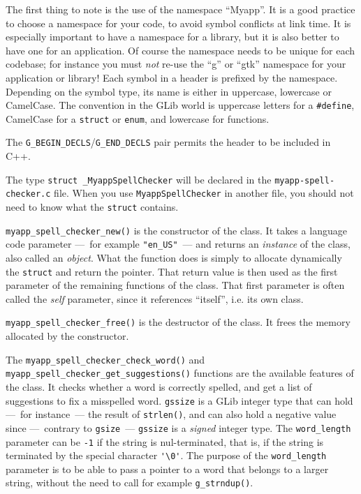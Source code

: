 The first thing to note is the use of the namespace ``Myapp''. It is a good practice to choose a namespace for your code, to avoid symbol conflicts at link time. It is especially important to have a namespace for a library, but it is also better to have one for an application. Of course the namespace needs to be unique for each codebase; for instance you must \emph{not} re-use the ``g'' or ``gtk'' namespace for your application or library! Each symbol in a header is prefixed by the namespace. Depending on the symbol type, its name is either in uppercase, lowercase or CamelCase. The convention in the GLib world is uppercase letters for a \lstinline{#define}, CamelCase for a \lstinline{struct} or \lstinline{enum}, and lowercase for functions.

The \lstinline{G_BEGIN_DECLS}/\lstinline{G_END_DECLS} pair permits the header to be included in C++.

The type \lstinline{struct _MyappSpellChecker} will be declared in the \texttt{myapp-spell-checker.c} file. When you use \lstinline{MyappSpellChecker} in another file, you should not need to know what the \lstinline{struct} contains.

\lstinline{myapp_spell_checker_new()} is the constructor of the class. It takes a language code parameter ---~for example \lstinline{"en_US"}~--- and returns an \emph{instance} of the class, also called an \emph{object}. What the function does is simply to allocate dynamically the \lstinline{struct} and return the pointer. That return value is then used as the first parameter of the remaining functions of the class. That first parameter is often called the \emph{self} parameter, since it references ``itself'', i.e. its own class.

\lstinline{myapp_spell_checker_free()} is the destructor of the class. It frees the memory allocated by the constructor.

The \lstinline{myapp_spell_checker_check_word()} and \lstinline{myapp_spell_checker_get_suggestions()} functions are the available features of the class. It checks whether a word is correctly spelled, and get a list of suggestions to fix a misspelled word. \lstinline{gssize} is a GLib integer type that can hold ---~for instance~--- the result of \lstinline{strlen()}, and can also hold a negative value since ---~contrary to \lstinline{gsize}~--- \lstinline{gssize} is a \emph{signed} integer type. The \lstinline{word_length} parameter can be \lstinline{-1} if the string is nul-terminated, that is, if the string is terminated by the special character \lstinline{'\0'}. The purpose of the \lstinline{word_length} parameter is to be able to pass a pointer to a word that belongs to a larger string, without the need to call for example \lstinline{g_strndup()}.

